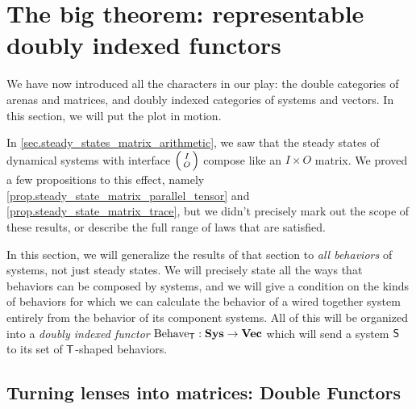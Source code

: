 \documentclass[DynamicalBook]{subfiles}
\begin{document}
\section{The big theorem: representable doubly indexed functors}

We have now introduced all the characters in our play: the double categories of
arenas and matrices, and doubly indexed categories of systems and vectors. In
this section, we will put the plot in motion. 

In \cref{sec.steady_states_matrix_arithmetic}, we saw that the steady states of
dynamical systems with interface $\lens{I}{O}$ compose like an $I \times O$
matrix. We proved a few propositions to this effect, namely
\cref{prop.steady_state_matrix_parallel_tensor} and
\cref{prop.steady_state_matrix_trace}, but we didn't precisely mark out the
scope of these results, or describe the full range of laws that are satisfied.

In this section, we will generalize the results of that section to \emph{all
  behaviors} of systems, not just steady states. We will precisely state all the
ways that behaviors can be composed by systems, and we will give a condition on
the kinds of behaviors for which we can calculate the behavior of a wired
together system entirely from the behavior of its component systems. All of this will be organized into a \emph{doubly indexed functor}
$\mathrm{Behave}_{\mathsf{T}} : \textbf{Sys} \to \textbf{Vec}$
which will send a system $\mathsf{S}$ to its set of
$\mathsf{T}$-shaped behaviors. 


\subsection{Turning lenses into matrices: Double Functors}
\end{document}
